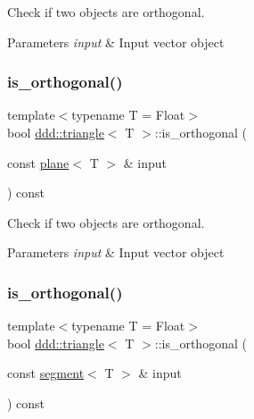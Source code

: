 Check if two objects are orthogonal. 


\begin{DoxyParams}{Parameters}
{\em input} & Input vector object \\
\hline
\end{DoxyParams}
\mbox{\label{classddd_1_1triangle_ab165278d21b58f2dde0c7cec255cdff0}} 
\subsubsection{\texorpdfstring{is\+\_\+orthogonal()}{is\_orthogonal()}\hspace{0.1cm}{\footnotesize\ttfamily [4/5]}}
{\footnotesize\ttfamily template$<$typename T = Float$>$ \\
bool \hyperlink{classddd_1_1triangle}{ddd\+::triangle}$<$ T $>$\+::is\+\_\+orthogonal (\begin{DoxyParamCaption}\item[{const \hyperlink{classddd_1_1plane}{plane}$<$ T $>$ \&}]{input }\end{DoxyParamCaption}) const\hspace{0.3cm}{\ttfamily [inline]}}



Check if two objects are orthogonal. 


\begin{DoxyParams}{Parameters}
{\em input} & Input vector object \\
\hline
\end{DoxyParams}
\mbox{\label{classddd_1_1triangle_a8be06a2c15e540723e277fc5ab131143}} 
\subsubsection{\texorpdfstring{is\+\_\+orthogonal()}{is\_orthogonal()}\hspace{0.1cm}{\footnotesize\ttfamily [5/5]}}
{\footnotesize\ttfamily template$<$typename T = Float$>$ \\
bool \hyperlink{classddd_1_1triangle}{ddd\+::triangle}$<$ T $>$\+::is\+\_\+orthogonal (\begin{DoxyParamCaption}\item[{const \hyperlink{classddd_1_1segment}{segment}$<$ T $>$ \&}]{input }\end{DoxyParamCaption}) const\hspace{0.3cm}{\ttfamily [inline]}}



